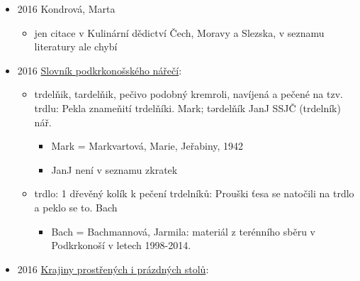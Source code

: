 \begin{itemize}
\begin{itemize}
    \begin{itemize}
    \tightlist
    \item
      recept na trdelník v troubě (kynutý těsto, bez másla),
    \item
      z těsta vyválíme placky, nakrájíme na proužky a pečeme je na
      kremrolových trubičkách nebo užších zavařovacích sklenicích
    \item
      před pečením se pomaže vejcem nebo olejem, obalíme ve skořicovém
      cukru nebo v rozemletých ořeších s cukrem
    \item
      pečeme 8 minut na 180 stupňů
    \item
      a taky je tam spousta dalších zajímavejch receptů
    \end{itemize}
  \end{itemize}
\item
  2016 Kondrová, Marta

  \begin{itemize}
  \tightlist
  \item
    jen citace v Kulinární dědictví Čech, Moravy a Slezska, v seznamu
    literatury ale chybí
  \end{itemize}
\item
  2016
  \href{https://ceskadigitalniknihovna.cz/view/uuid:cc664180-3864-11ea-85b5-005056827e52?page=uuid\%3A2786f459-7045-4ac5-8f33-a52948185820&fulltext=trdeln\%C3\%ADk\%20OR\%20trdeln\%C3\%ADky\%20OR\%20trdeln\%C3\%ADk\%C5\%AF&source=mzk}{Slovník
  podkrkonošského nářečí}:

  \begin{itemize}
  \tightlist
  \item
    trdelňik, tardelňik, pečivo podobný kremroli, navíjená a pečené na
    tzv. trdlu: Pekla znameňití trdelňíki. Mark; tǝrdelňík JanJ SSJČ
    (trdelník) nář.

    \begin{itemize}
    \tightlist
    \item
      Mark = Markvartová, Marie, Jeřabiny, 1942
    \item
      JanJ není v seznamu zkratek
    \end{itemize}
  \item
    trdlo: 1 dřevěný kolík k pečení trdelníků: Prouški ťesa se natočili
    na trdlo a peklo se to. Bach

    \begin{itemize}
    \tightlist
    \item
      Bach = Bachmannová, Jarmila: materiál z terénního sběru v
      Podkrkonoší v letech 1998-2014.
    \end{itemize}
  \end{itemize}
\item
  2016
  \href{https://www.digitalniknihovna.cz/knav/uuid/uuid:fe36807f-2e9f-47b2-be74-0f082b838946}{Krajiny
  prostřených i prázdných stolů}:


\end{itemize}
